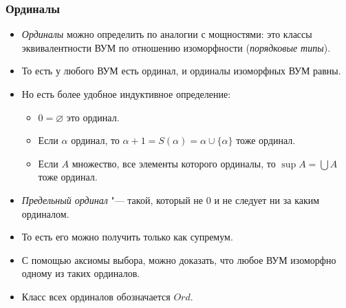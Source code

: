 \documentclass[10pt]{beamer}
\begin{document}
\begin{frame}
    \frametitle{Ординалы}
    \begin{itemize}
        \item \emph{Ординалы} можно определить по аналогии с мощностями: это классы эквивалентности ВУМ по отношению изоморфности (\emph{порядковые типы}).
        \item То есть у любого ВУМ есть ординал, и ординалы изоморфных ВУМ равны.
        \item Но есть более удобное индуктивное определение:
        \begin{itemize}
            \item $0 = \varnothing$ это ординал.
            \item Если $\alpha$ ординал, то $\alpha + 1 = S(\alpha) = \alpha \cup \{\alpha\}$ тоже ординал.
            \item Если $A$ множество, все элементы которого ординалы, то $\sup A = \bigcup A$ тоже ординал.
        \end{itemize}
        \item \emph{Предельный ординал} "--- такой, который не $0$ и не следует ни за каким ординалом.
        \item То есть его можно получить только как супремум.
        \item С помощью аксиомы выбора, можно доказать, что любое ВУМ изоморфно одному из таких ординалов.
        \item Класс всех ординалов обозначается $Ord$.
    \end{itemize}
\end{frame}
\end{document}
